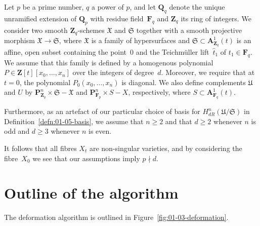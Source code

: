 \begin{notation} \label{not:01-03-main}
Let $p$ be a prime number, $q$ a power of $p$, and let $\mathbf{Q}_q$ 
denote the unique unramified extension of $\mathbf{Q}_p$ with residue 
field~$\mathbf{F}_q$ and $\mathbf{Z}_q$ its ring of integers.  
We consider two smooth $\mathbf{Z}_q$-schemes $\mathfrak{X}$ and $\mathfrak{S}$ 
together with a smooth projective morphism $\mathfrak{X} \to \mathfrak{S}$, 
where $\mathfrak{X}$ is a family of hypersurfaces 
and $\mathfrak{S} \subset \mathbf{A}_{\mathbf{Z}_q}^1(t)$ is an affine, open 
subset containing the point~$0$ and the Teichm\"uller lift~$\hat{t}_1$ of 
$t_1 \in \mathbf{F}_q$.  
We assume that this family is defined by a homogenous polynomial 
$P \in \mathbf{Z}[t][x_0,\dotsc,x_n]$ over the integers of degree~$d$.  
Moreover, we require that at $t = 0$, the polynomial $P_0(x_0,\dotsc,x_n)$ 
is diagonal.  
We also define complements 
$\mathfrak{U}$ and $U$ by $\mathbf{P}_{\mathbf{Z}_q}^n \times \mathfrak{S} - \mathfrak{X}$ 
and $\mathbf{P}_{\mathbf{F}_p}^n \times S - X$, respectively, 
where $S \subset \mathbf{A}_{\mathbf{F}_q}^1(t)$.  
\end{notation}

\begin{notation}
Furthermore, as an artefact of our particular choice of basis for 
$H_{dR}^n(\mathfrak{U}/\mathfrak{S})$ in Definition~\ref{defn:01-05-basis}, 
we assume that $n \geq 2$ and that $d \geq 2$ whenever $n$ is odd and 
$d \geq 3$ whenever $n$ is even.
\end{notation}

\begin{rem}
It follows that all fibres $X_t$ are non-singular varieties, and by 
considering the fibre~$X_0$ we see that our assumptions imply $p \nmid d$.
\end{rem}


\section{Outline of the algorithm}

The deformation algorithm is outlined in Figure~\ref{fig:01-03-deformation}.

